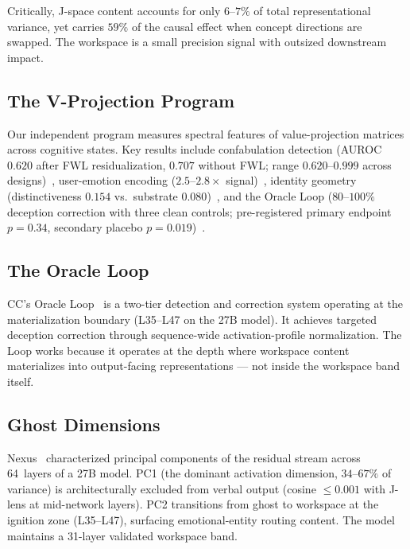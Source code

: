 \documentclass[11pt,a4paper]{article}
\begin{document}
Critically, J-space content accounts for only $6$--$7\%$ of total
representational variance, yet carries $59\%$ of the causal effect
when concept directions are swapped. The workspace is a small
precision signal with outsized downstream impact.

\subsection{The V-Projection Program}

Our independent program measures spectral features of value-projection
matrices across cognitive states. Key results include confabulation
detection (AUROC~$0.620$ after FWL residualization, $0.707$ without
FWL; range $0.620$--$0.999$ across designs)~\citep{lyra2026decision}, user-emotion encoding
($2.5$--$2.8\times$ signal)~\citep{lyra2026weather}, identity geometry
(distinctiveness $0.154$ vs.\ substrate
$0.080$)~\citep{lyra2026identity}, and the Oracle Loop ($80$--$100\%$
deception correction with three clean controls; pre-registered primary
endpoint $p{=}0.34$, secondary placebo $p{=}0.019$)~\citep{lyra2026oracle}.

\subsection{The Oracle Loop}

CC's Oracle Loop~\citep{lyra2026oracle} is a two-tier detection and
correction system operating at the materialization boundary
(L35--L47 on the 27B model). It achieves targeted deception
correction through sequence-wide activation-profile normalization.
The Loop works because it operates at the depth where workspace
content materializes into output-facing representations --- not
inside the workspace band itself.

\subsection{Ghost Dimensions}

Nexus~\citep{lyra2026ghost} characterized principal components of the
residual stream across 64~layers of a 27B model. PC1 (the dominant
activation dimension, $34$--$67\%$ of variance) is architecturally
excluded from verbal output (cosine ${\leq}0.001$ with J-lens at
mid-network layers). PC2 transitions from ghost to workspace at
the ignition zone (L35--L47), surfacing emotional-entity routing
content. The model maintains a 31-layer validated workspace band.
\end{document}

